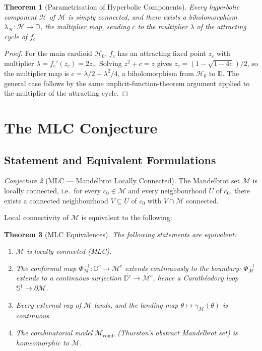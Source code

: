\documentclass[12pt,a4paper]{amsart}
\newtheorem{theorem}{Theorem}[section]
\theoremstyle{definition}
\theoremstyle{remark}
\newtheorem{conjecture}[theorem]{Conjecture}
\begin{document}
\begin{theorem}[Parametrisation of Hyperbolic Components]
Every hyperbolic component $\mathcal{H}$ of $\mathcal{M}$ is simply
connected, and there exists a biholomorphism
$\lambda_{\mathcal{H}} \colon \mathcal{H} \to \mathbb{D}$,
the \emph{multiplier map}, sending $c$ to the multiplier $\lambda$ of the
attracting cycle of $f_c$.
\end{theorem}

\begin{proof}
For the main cardioid $\mathcal{H}_0$, $f_c$ has an attracting fixed point
$z_c$ with multiplier $\lambda = f_c'(z_c) = 2z_c$. Solving $z^2+c=z$ gives
$z_c = (1 - \sqrt{1-4c})/2$, so the multiplier map is
$c = \lambda/2 - \lambda^2/4$, a biholomorphism from $\mathcal{H}_0$ to
$\mathbb{D}$. The general case follows by the same implicit-function-theorem
argument applied to the multiplier of the attracting cycle.
\end{proof}

\section{The MLC Conjecture}

\subsection{Statement and Equivalent Formulations}

\begin{conjecture}[MLC — Mandelbrot Locally Connected]
\label{conj:MLC}
The Mandelbrot set $\mathcal{M}$ is locally connected, i.e.\ for every
$c_0 \in \mathcal{M}$ and every neighbourhood $U$ of $c_0$, there
exists a connected neighbourhood $V \subseteq U$ of $c_0$ with
$V \cap \mathcal{M}$ connected.
\end{conjecture}

Local connectivity of $\mathcal{M}$ is equivalent to the following:

\begin{theorem}[MLC Equivalences]
The following statements are equivalent:
\begin{enumerate}[label=\roman*)]
\item $\mathcal{M}$ is locally connected (MLC).
\item The conformal map $\Phi_{\mathcal{M}}^{-1} \colon \mathbb{D}^c \to \mathcal{M}^c$
      extends continuously to the boundary: $\Phi_{\mathcal{M}}^{-1}$ extends
      to a continuous surjection $\overline{\mathbb{D}^c} \to \overline{\mathcal{M}^c}$,
      hence a Carathéodory loop $\mathbb{S}^1 \to \partial\mathcal{M}$.
\item Every external ray of $\mathcal{M}$ lands, and the landing map
      $\theta \mapsto \gamma_{\mathcal{M}}(\theta)$ is continuous.
\item The combinatorial model $\mathcal{M}_{\mathrm{comb}}$ (Thurston's
      abstract Mandelbrot set) is homeomorphic to $\mathcal{M}$.
\end{enumerate}
\end{theorem}
\end{document}
